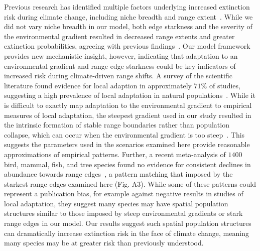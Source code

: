 \documentclass[11pt]{article}
\begin{document}
Previous research has identified multiple factors underlying increased extinction risk during climate change, including niche breadth and range extent~\citep{thuiller2005niche, schwartz2006predicting}. While we did not vary niche breadth in our model, both edge starkness and the severity of the environmental gradient resulted in decreased range extents and greater extinction probabilities, agreeing with previous findings~\citep{schwartz2006predicting}. Our model framework provides new mechanistic insight, however, indicating that adaptation to an environmental gradient and range edge starkness could be key indicators of increased risk during climate-driven range shifts. A survey of the scientific literature found evidence for local adaption in approximately $71\%$ of studies, suggesting a high prevalence of local adaptation in natural populations~\citep{hereford2009quantitative}. While it is difficult to exactly map adaptation to the environmental gradient to empirical measures of local adaptation, the steepest gradient used in our study resulted in the intrinsic formation of stable range boundaries rather than population collapse, which can occur when the environmental gradient is too steep~\citep{kirkpatrick1997evolution, alleaume2006geographical, polechova2015limits, polechova2018sky}. This suggests the parameters used in the scenarios examined here provide reasonable approximations of empirical patterns. Further, a recent meta-analysis of $1400$ bird, mammal, fish, and tree species found no evidence for consistent declines in abundance towards range edges~\citep{dallas2017species}, a pattern matching that imposed by the starkest range edges examined here (Fig. A3). While some of these patterns could represent a publication bias, for example against negative results in studies of local adaptation, they suggest many species may have spatial population structures similar to those imposed by steep environmental gradients or stark range edges in our model. Our results suggest such spatial population structures can dramatically increase extinction risk in the face of climate change, meaning many species may be at greater risk than previously understood.
\end{document}
